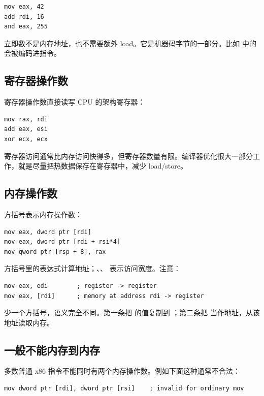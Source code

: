 \begin{lstlisting}
mov eax, 42
add rdi, 16
and eax, 255
\end{lstlisting}

立即数不是内存地址，也不需要额外 load。它是机器码字节的一部分。比如  中的  会被编码进指令。

\subsection{寄存器操作数}

寄存器操作数直接读写 CPU 的架构寄存器：

\begin{lstlisting}
mov rax, rdi
add eax, esi
xor ecx, ecx
\end{lstlisting}

寄存器访问通常比内存访问快得多，但寄存器数量有限。编译器优化很大一部分工作，就是尽量把热数据保存在寄存器中，减少 load/store。

\subsection{内存操作数}

方括号表示内存操作数：

\begin{lstlisting}
mov eax, dword ptr [rdi]
mov eax, dword ptr [rdi + rsi*4]
mov qword ptr [rsp + 8], rax
\end{lstlisting}

方括号里的表达式计算地址；、、 表示访问宽度。注意：

\begin{lstlisting}
mov eax, edi        ; register -> register
mov eax, [rdi]      ; memory at address rdi -> register
\end{lstlisting}

少一个方括号，语义完全不同。第一条把  的值复制到 ；第二条把  当作地址，从该地址读取内存。

\subsection{一般不能内存到内存}

多数普通 x86 指令不能同时有两个内存操作数。例如下面这种通常不合法：

\begin{lstlisting}
mov dword ptr [rdi], dword ptr [rsi]    ; invalid for ordinary mov
\end{lstlisting}

